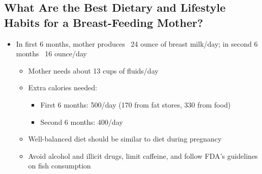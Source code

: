 \documentclass[12pt]{article}
\begin{document}
        \subsection{What Are the Best Dietary and Lifestyle Habits for a Breast-Feeding Mother?}
            \begin{itemize}
                \item In first 6 months, mother produces ~24 ounce of breast milk/day; in second 6 months ~16 ounce/day
                    \begin{itemize}
                        \item Mother needs about 13 cups of fluids/day
                        \item Extra calories needed:
                            \begin{itemize}
                                \item First 6 months: 500/day (170 from fat stores, 330 from food)
                                \item Second 6 months: 400/day
                            \end{itemize}
                        \item Well-balanced diet should be similar to diet during pregnancy
                        \item Avoid alcohol and illicit drugs, limit caffeine, and follow FDA's guidelines on fish consumption
                    \end{itemize}
            \end{itemize}
\end{document}

